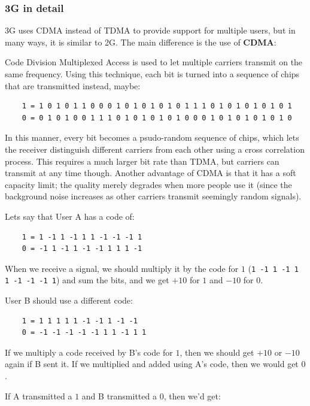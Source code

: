 \subsubsection{3G in detail}

3G uses CDMA instead of TDMA to provide support for multiple users, but in many
ways, it is similar to 2G. The main difference is the use of \textbf{CDMA}:

  Code Division Multiplexed Access is used to let multiple carriers transmit
  on the same frequency. Using this technique, each bit is turned into a 
  sequence of chips that are transmitted instead, maybe:

  \begin{verbatim}
    1 = 1 0 1 0 1 1 0 0 0 1 0 1 0 1 0 1 0 1 1 1 0 1 0 1 0 1 0 1 0 1
    0 = 0 1 0 1 0 0 1 1 1 0 1 0 1 0 1 0 1 0 0 0 1 0 1 0 1 0 1 0 1 0
  \end{verbatim}

  In this manner, every bit becomes a psudo-random sequence of chips, which
  lets the receiver distinguish different carriers from each other using a
  cross correlation process. This requires a much larger bit rate than TDMA,
  but carriers can transmit at any time though. Another advantage of CDMA is
  that it has a soft capacity limit; the quality merely degrades when more
  people use it (since the background noise increases as other carriers
  transmit seemingly random signals).

  Lets say that User A has a code of:

  \begin{verbatim}
    1 = 1 -1 1 -1 1 1 -1 -1 -1 1
    0 = -1 1 -1 1 -1 -1 1 1 1 -1
  \end{verbatim}

  When we receive a signal, we should multiply it by the code for $1$
  (\texttt{1 -1 1 -1 1 1 -1 -1 -1 1}) and sum the bits, and we get $+10$ for
  $1$ and $-10$ for $0$.

  User B should use a different code:

  \begin{verbatim}
    1 = 1 1 1 1 1 -1 -1 1 -1 -1 
    0 = -1 -1 -1 -1 -1 1 1 -1 1 1
  \end{verbatim}

  If we multiply a code received by B's code for $1$, then we should get $+10$
  or $-10$ again if B sent it. If we multiplied and added using A's code, then
  we would get $0$.

  If A transmitted a $1$ and B transmitted a $0$, then we'd get:

